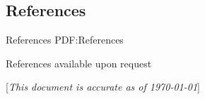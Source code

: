 \documentclass[a4paper,10pt,oneside]{article}
\newcommand{\CVNote}{This document is accurate as of {\today}}
\begin{document}
\begin{minipage}[t][0pt]{\linewidth}
\begin{body}

\section
{References}
{References}
{PDF:References}


\par References available upon request

\end{body}


\begin{flushright}
\scriptsize%
[\textit{\CVNote}]%
\hspace{2.0mm}\null
\end{flushright}

\label{LastPage}~
\end{minipage}
\end{document}
